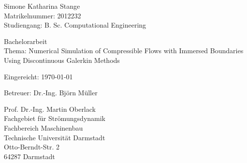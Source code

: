 \vspace*{14cm}
{\parindent0pt
Simone Katharina Stange\\
Matrikelnummer: 2012232 \\
Studiengang: B. Sc. Computational Engineering\newline
 
Bachelorarbeit\\
Thema: Numerical Simulation of Compressible Flows with Immersed Boundaries Using Discontinuous Galerkin Methods\newline

Eingereicht: \today\newline

Betreuer: Dr.-Ing. Björn Müller \newline

Prof. Dr.-Ing. Martin Oberlack \\
Fachgebiet für Strömungsdynamik\\
Fachbereich Maschinenbau \\
Technische Universität Darmstadt \\
Otto-Berndt-Str. 2 \\
64287 Darmstadt}